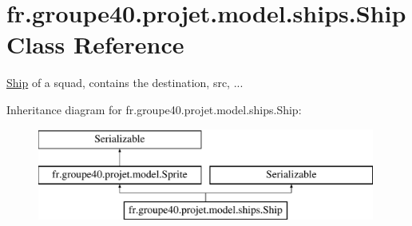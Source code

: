 \hypertarget{classfr_1_1groupe40_1_1projet_1_1model_1_1ships_1_1_ship}{}\section{fr.\+groupe40.\+projet.\+model.\+ships.\+Ship Class Reference}
\label{classfr_1_1groupe40_1_1projet_1_1model_1_1ships_1_1_ship}


\hyperlink{classfr_1_1groupe40_1_1projet_1_1model_1_1ships_1_1_ship}{Ship} of a squad, contains the destination, src, ...  


Inheritance diagram for fr.\+groupe40.\+projet.\+model.\+ships.\+Ship\+:\begin{figure}[H]
\begin{center}
\leavevmode
\includegraphics[height=3.000000cm]{classfr_1_1groupe40_1_1projet_1_1model_1_1ships_1_1_ship}
\end{center}
\end{figure}
